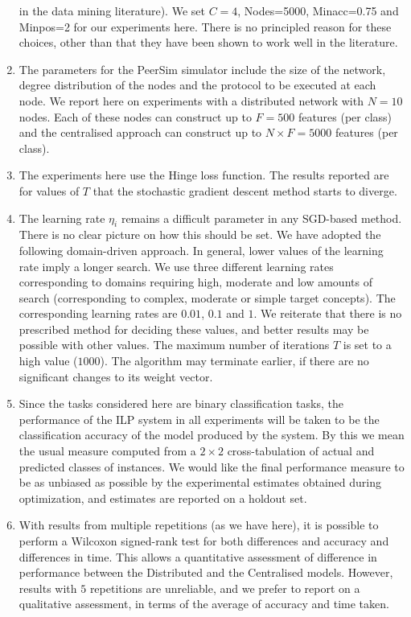 \begin{enumerate}
    in the data mining literature). We set $C=4$, Nodes=5000, Minacc=0.75 and
    Minpos=2 for our experiments here. There is no principled reason for these choices, other
    than that they have been shown to work well in the literature.
\item The parameters for the PeerSim simulator include the size of the network,
    degree distribution of the nodes and the protocol to be executed at each node.
    We report here on experiments with a distributed network with $N=10$ nodes.
    Each of these nodes can construct up to $F = 500$ features (per class) and
    the centralised approach can construct up to $N \times F = 5000$ features (per class).
\item The experiments here use the Hinge loss function. The results reported
    are for values of $T$ that the stochastic gradient descent method starts
    to diverge.
\item The learning rate $\eta_i$ remains a difficult parameter in any SGD-based method. There is no
    clear picture on how this should be set. We have adopted the following domain-driven approach.
    In general, lower values of the learning rate imply a longer search. We use three different learning
    rates corresponding to domains requiring high, moderate and low amounts of search (corresponding to
    complex, moderate or simple target concepts). The corresponding learning rates are
    $0.01$, $0.1$ and $1$. We reiterate that there is no prescribed method for deciding these values,
    and better results may be possible with other values.
   The maximum number of iterations $T$ is set to a high value ($1000$). The algorithm
   may terminate earlier, if there are no significant changes to its weight vector.
 \item Since the tasks considered here are binary classification tasks, the performance of the
    ILP system in all experiments will be taken to be the classification accuracy of the
    model produced by the system. By this we mean the usual measure computed from
    a $2 \times 2$ cross-tabulation of actual and predicted classes of instances.
    We would like the final performance measure to be as unbiased as possible by the
    experimental estimates obtained during optimization, and estimates are reported on a holdout set.
\item With results from multiple repetitions (as we have here), it is possible to perform
    a Wilcoxon signed-rank test for both differences and accuracy and differences in time.
    This allows a quantitative assessment of difference in
    performance between the Distributed and the Centralised models. However, results with
    $5$ repetitions are unreliable, and we
    prefer to report on a qualitative assessment, in terms of the average of
    accuracy and time taken. 
\end{enumerate} 

